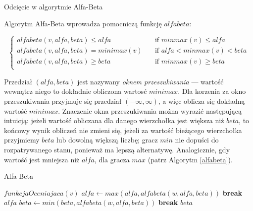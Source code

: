 \documentclass{pracamgr}
\begin{document}
\begin{rysunek}
\caption{Odcięcie w algorytmie Alfa-Beta \label{alfa-beta-cut}}
\centering

\end{rysunek}

Algorytm Alfa-Beta wprowadza pomocniczą funkcję \(alfabeta\):

\[
  \begin{cases}
    alfabeta(v, alfa, beta) \leq alfa    & \quad \text{if } minmax(v) \leq alfa\\
    alfabeta(v, alfa, beta) = minimax(v) & \quad \text{if } alfa < minmax(v) < beta \\
    alfabeta(v, alfa, beta) \geq beta    & \quad \text{if } minmax(v) \geq beta \\
  \end{cases}
\]

Przedział \((alfa, beta)\) jest nazywany \emph{oknem przeszukiwania} --- wartość wewnątrz niego to dokładnie obliczona wartosć \(minimax\).
Dla korzenia za okno przeszukiwania przyjmuje się przedział \((-\infty, \infty)\), a więc oblicza się dokładną wartość \(minimax\).
Znaczenie okna przeszukiwania można wyrazić następującą intuicją: jeżeli wartość obliczana dla danego wierzchołka jest większa niż \(beta\), to końcowy wynik obliczeń nie zmieni się, jeżeli za wartość bieżącego wierzchołka przyjmiemy \(beta\) lub dowolną większą liczbę; gracz \(min\) nie dopuści do rozpatrywanego stanu, ponieważ ma lepszą alternatywę.
Analogicznie, gdy wartość jest mniejsza niż \(alfa\), dla gracza \(max\) (patrz Algorytm \ref{alfabeta}).

\begin{algorytm}
\caption{Alfa-Beta\label{alfabeta}}
\begin{algorithmic}[1]
	\State \Return $funkcjaOceniajaca(v)$
\EndIf
        \State $alfa \gets max(alfa, alfabeta(w, alfa, beta))$
            \State \textbf{break}
        \EndIf
    \EndFor
	\State \Return $alfa$
\Else
        \State $beta \gets min(beta, alfabeta(w, alfa, beta))$
            \State \textbf{break}
        \EndIf
    \EndFor
	\State \Return $beta$
\EndIf
\EndFunction
\end{algorithmic}
\end{algorytm}
\end{document}
